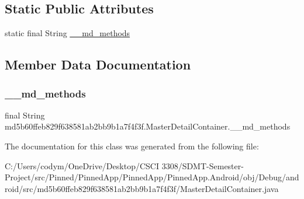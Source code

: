 \subsection*{Static Public Attributes}
\begin{DoxyCompactItemize}
\item 
static final String \hyperlink{classmd5b60ffeb829f638581ab2bb9b1a7f4f3f_1_1_master_detail_container_a556c7fb30e166beeb9cd843dea89366f}{\+\_\+\+\_\+md\+\_\+methods}
\end{DoxyCompactItemize}


\subsection{Member Data Documentation}
\mbox{\label{classmd5b60ffeb829f638581ab2bb9b1a7f4f3f_1_1_master_detail_container_a556c7fb30e166beeb9cd843dea89366f}} 
\subsubsection{\texorpdfstring{\+\_\+\+\_\+md\+\_\+methods}{\_\_md\_methods}}
{\footnotesize\ttfamily final String md5b60ffeb829f638581ab2bb9b1a7f4f3f.\+Master\+Detail\+Container.\+\_\+\+\_\+md\+\_\+methods\hspace{0.3cm}{\ttfamily [static]}}



The documentation for this class was generated from the following file\+:\begin{DoxyCompactItemize}
\item 
C\+:/\+Users/codym/\+One\+Drive/\+Desktop/\+C\+S\+C\+I 3308/\+S\+D\+M\+T-\/\+Semester-\/\+Project/src/\+Pinned/\+Pinned\+App/\+Pinned\+App/\+Pinned\+App.\+Android/obj/\+Debug/android/src/md5b60ffeb829f638581ab2bb9b1a7f4f3f/Master\+Detail\+Container.\+java\end{DoxyCompactItemize}
